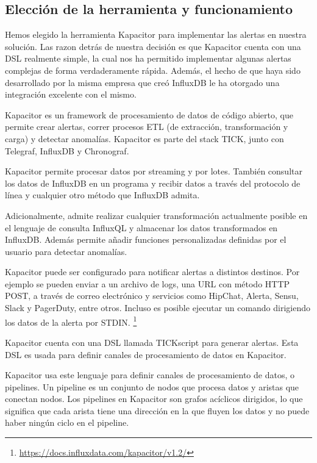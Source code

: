 \subsection{Elección de la herramienta y funcionamiento}
\label{eleccion-herramienta}

Hemos elegido la herramienta Kapacitor para implementar las alertas en nuestra solución. Las razon detrás de nuestra decisión es que Kapacitor cuenta con una DSL realmente simple, la cual nos ha permitido implementar algunas alertas complejas de forma verdaderamente rápida. Además, el hecho de que haya sido desarrollado por la misma empresa que creó InfluxDB le ha otorgado una integración excelente con el mismo.

Kapacitor es un framework de procesamiento de datos de código abierto, que permite crear alertas, correr procesos ETL (de extracción, transformación y carga) y detectar anomalías. Kapacitor es parte del stack TICK, junto con Telegraf, InfluxDB y Chronograf.

Kapacitor permite procesar datos por streaming y por lotes. También consultar los datos de InfluxDB en un programa y recibir datos a través del protocolo de línea y cualquier otro método que InfluxDB admita.

Adicionalmente, admite realizar cualquier transformación actualmente posible en el lenguaje de consulta InfluxQL y almacenar los datos transformados en InfluxDB. Además permite añadir funciones personalizadas definidas por el usuario para detectar anomalías.

Kapacitor puede ser configurado para notificar alertas a distintos destinos. Por ejemplo se pueden enviar a un archivo de logs, una URL con método HTTP POST, a través de correo electrónico y servicios como HipChat, Alerta, Sensu, Slack y PagerDuty, entre otros. Incluso es posible ejecutar un comando dirigiendo los datos de la alerta por STDIN. \footnote{\url{https://docs.influxdata.com/kapacitor/v1.2/}}

Kapacitor cuenta con una DSL llamada TICKscript para generar alertas. Esta DSL es usada para definir canales de procesamiento de datos en Kapacitor.

Kapacitor usa este lenguaje para definir canales de procesamiento de datos, o pipelines. Un pipeline es un conjunto de nodos que procesa datos y aristas que conectan nodos. Los pipelines en Kapacitor son grafos acíclicos dirigidos, lo que significa que cada arista tiene una dirección en la que fluyen los datos y no puede haber ningún ciclo en el pipeline.

